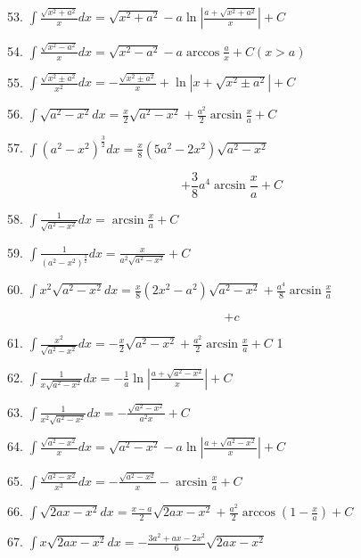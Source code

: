 \documentclass[lang=cn,newtx,10pt,scheme=chinese]{elegantbook}
\begin{document}
53. \(\int \frac{\sqrt{{x}^{2} + {a}^{2}}}{x}{dx} = \sqrt{{x}^{2} + {a}^{2}} - a\ln \left| \frac{a + \sqrt{{x}^{2} + {a}^{2}}}{x}\right| + C\)

54. \(\int \frac{\sqrt{{x}^{2} - {a}^{2}}}{x}{dx} = \sqrt{{x}^{2} - {a}^{2}} - a\arccos \frac{a}{x} + C\left( {x > a}\right)\)

55. \(\int \frac{\sqrt{{x}^{2} \pm {a}^{2}}}{{x}^{2}}{dx} = - \frac{\sqrt{{x}^{2} \pm {a}^{2}}}{x} + \ln \left| {x + \sqrt{{x}^{2} \pm {a}^{2}}}\right| + C\)

56. \(\int \sqrt{{a}^{2} - {x}^{2}}{dx} = \frac{x}{2}\sqrt{{a}^{2} - {x}^{2}} + \frac{{a}^{2}}{2}\arcsin \frac{x}{a} + C\)

57. \(\int {\left( {a}^{2} - {x}^{2}\right) }^{\frac{3}{2}}{dx} = \frac{x}{8}\left( {5{a}^{2} - 2{x}^{2}}\right) \sqrt{{a}^{2} - {x}^{2}}\)

\[
+ \frac{3}{8}{a}^{4}\arcsin \frac{x}{a} + C
\]

58. \(\int \frac{1}{\sqrt{{a}^{2} - {x}^{2}}}{dx} = \arcsin \frac{x}{a} + C\)

59. \(\int \frac{1}{{\left( {a}^{2} - {x}^{2}\right) }^{\frac{3}{2}}}{dx} = \frac{x}{{a}^{2}\sqrt{{a}^{2} - {x}^{2}}} + C\)

60. \(\int {x}^{2}\sqrt{{a}^{2} - {x}^{2}}{dx} = \frac{x}{8}\left( {2{x}^{2} - {a}^{2}}\right) \sqrt{{a}^{2} - {x}^{2}} + \frac{{a}^{4}}{8}\arcsin \frac{x}{a}\)

\[
+ c
\]

61. \(\int \frac{{x}^{2}}{\sqrt{{a}^{2} - {x}^{2}}}{dx} = - \frac{x}{2}\sqrt{{a}^{2} - {x}^{2}} + \frac{{a}^{2}}{2}\arcsin \frac{x}{a} + C\) 1

62. \(\int \frac{1}{x\sqrt{{a}^{2} - {x}^{2}}}{dx} = - \frac{1}{a}\ln \left| \frac{a + \sqrt{{a}^{2} - {x}^{2}}}{x}\right| + C\)

63. \(\int \frac{1}{{x}^{2}\sqrt{{a}^{2} - {x}^{2}}}{dx} = - \frac{\sqrt{{a}^{2} - {x}^{2}}}{{a}^{2}x} + C\)

64. \(\int \frac{\sqrt{{a}^{2} - {x}^{2}}}{x}{dx} = \sqrt{{a}^{2} - {x}^{2}} - a\ln \left| \frac{a + \sqrt{{a}^{2} - {x}^{2}}}{x}\right| + C\)

65. \(\int \frac{\sqrt{{a}^{2} - {x}^{2}}}{{x}^{2}}{dx} = - \frac{\sqrt{{a}^{2} - {x}^{2}}}{x} - \arcsin \frac{x}{a} + C\)

66. \(\int \sqrt{{2ax} - {x}^{2}}{dx} = \frac{x - a}{2}\sqrt{{2ax} - {x}^{2}} + \frac{{a}^{2}}{2}\arccos \left( {1 - \frac{x}{a}}\right) + C\)

67. \(\int x\sqrt{{2ax} - {x}^{2}}{dx} = - \frac{3{a}^{2} + {ax} - 2{x}^{2}}{6}\sqrt{{2ax} - {x}^{2}}\)
\end{document}
